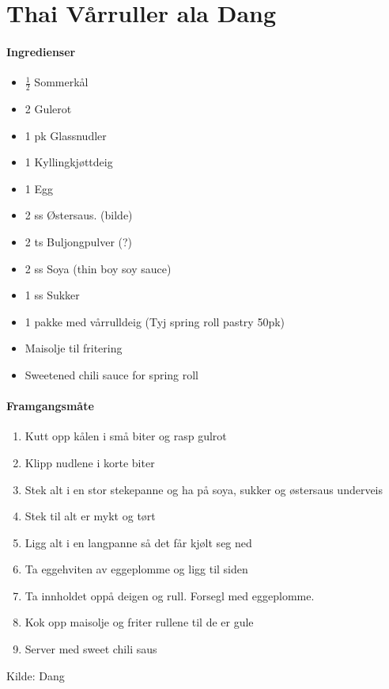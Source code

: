 \section{﻿Thai Vårruller ala Dang}


\paragraph{Ingredienser}
\begin{itemize}[noitemsep]
	\item  $\frac{1}{2}$  Sommerkål
	\item 2 Gulerot
	\item 1 pk Glassnudler
	\item 1 Kyllingkjøttdeig
	\item 1 Egg
	\item 2 ss Østersaus. (bilde)
	\item 2 ts Buljongpulver (?)
	\item 2 ss Soya (thin boy soy sauce)
	\item 1 ss Sukker
	\item 1 pakke med vårrulldeig (Tyj spring roll pastry 50pk)
	\item Maisolje til fritering
	\item Sweetened chili sauce for spring roll
\end{itemize}

\paragraph{Framgangsmåte}
\begin{enumerate}[noitemsep]
	\item Kutt opp kålen i små biter og rasp gulrot
	\item Klipp nudlene i korte biter
	\item Stek alt i en stor stekepanne og ha  på soya, sukker og østersaus underveis
	\item Stek til alt er mykt og tørt
	\item Ligg alt i en langpanne så det får kjølt seg ned
	\item Ta eggehviten av eggeplomme og ligg til siden
	\item Ta innholdet oppå deigen og rull.  Forsegl med eggeplomme.
	\item Kok opp maisolje og friter rullene til de er gule
	\item Server med sweet chili saus
\end{enumerate}

Kilde: Dang
